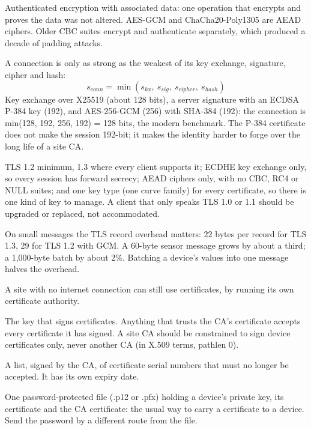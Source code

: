  Authenticated encryption with associated data: one operation that encrypts and proves the data was not altered. AES-GCM and ChaCha20-Poly1305 are AEAD ciphers. Older CBC suites encrypt and authenticate separately, which produced a decade of padding attacks.

 A connection is only as strong as the weakest of its key exchange, signature, cipher and hash:
\[ s_{conn} = \min(s_{kx},\ s_{sig},\ s_{cipher},\ s_{hash}) \]
 Key exchange over X25519 (about 128 bits), a server signature with an ECDSA P-384 key (192), and AES-256-GCM (256) with SHA-384 (192): the connection is min(128, 192, 256, 192) = 128 bits, the modern benchmark. The P-384 certificate does not make the session 192-bit; it makes the identity harder to forge over the long life of a site CA.

 TLS 1.2 minimum, 1.3 where every client supports it; ECDHE key exchange only, so every session has forward secrecy; AEAD ciphers only, with no CBC, RC4 or NULL suites; and one key type (one curve family) for every certificate, so there is one kind of key to manage. A client that only speaks TLS 1.0 or 1.1 should be upgraded or replaced, not accommodated.

On small messages the TLS record overhead matters: 22 bytes per record for TLS 1.3, 29 for TLS 1.2 with GCM. A 60-byte sensor message grows by about a third; a 1,000-byte batch by about 2\%. Batching a device's values into one message halves the overhead.

A site with no internet connection can still use certificates, by running its own certificate authority.

 The key that signs certificates. Anything that trusts the CA's certificate accepts every certificate it has signed. A site CA should be constrained to sign device certificates only, never another CA (in X.509 terms, pathlen 0).

 A list, signed by the CA, of certificate serial numbers that must no longer be accepted. It has its own expiry date.

 One password-protected file (.p12 or .pfx) holding a device's private key, its certificate and the CA certificate: the usual way to carry a certificate to a device. Send the password by a different route from the file.

